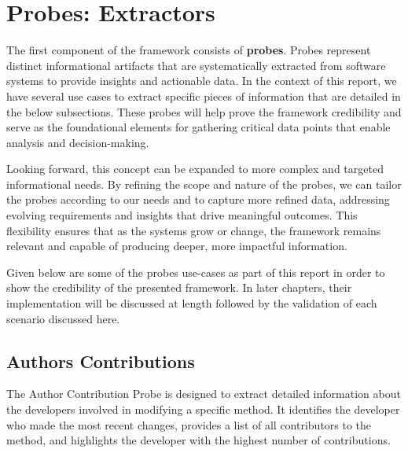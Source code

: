 \section{Probes: Extractors}\label{sec:component-probes}

The first component of the framework consists of \textbf{probes}. Probes represent distinct informational artifacts that are systematically extracted from software systems to provide insights and actionable data. In the context of this report, we have several use cases to extract specific pieces of information that are detailed in the below subsections. These probes will help prove the framework credibility and serve as the foundational elements for gathering critical data points that enable analysis and decision-making. 

Looking forward, this concept can be expanded to more complex and targeted informational needs. By refining the scope and nature of the probes, we can tailor the probes according to our needs and to capture more refined data, addressing evolving requirements and insights that drive meaningful outcomes. This flexibility ensures that as the systems grow or change, the framework remains relevant and capable of producing deeper, more impactful information.

Given below are some of the probes use-cases as part of this report in order to show the credibility of the presented framework. In later chapters, their implementation will be discussed at length followed by the validation of each scenario discussed here.

\subsection{Authors Contributions}
The Author Contribution Probe is designed to extract detailed information about the developers involved in modifying a specific method. It identifies the developer who made the most recent changes, provides a list of all contributors to the method, and highlights the developer with the highest number of contributions.
